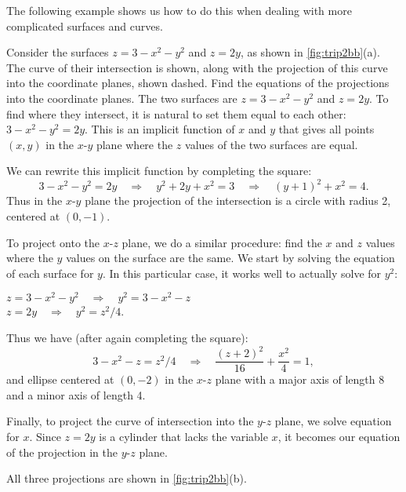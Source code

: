 The following example shows us how to do this when dealing with more complicated surfaces and curves.


\begin{example}\label{ex_trip2b}
Consider the surfaces $z=3-x^2-y^2$ and $z=2y$, as shown in \autoref{fig:trip2bb}(a). The curve of their intersection is shown, along with the projection of this curve into the coordinate planes, shown dashed. Find the equations of the projections into the coordinate planes.
\solution
The two surfaces are $z=3-x^2-y^2$ and $z=2y$. To find where they intersect, it is natural to set them equal to each other: $3-x^2-y^2=2y$. This is an implicit function of $x$ and $y$ that gives all points $(x,y)$ in the $x$-$y$ plane where the $z$ values of the two surfaces are equal. 

We can rewrite this implicit function by completing the square:
\[3-x^2-y^2=2y \quad \Rightarrow \quad y^2+2y+x^2=3\quad \Rightarrow \quad (y+1)^2+x^2=4.\]
Thus in the $x$-$y$ plane the projection of the intersection is a circle with radius 2, centered at $(0,-1)$.

To project onto the $x$-$z$ plane, we do a similar procedure: find the $x$ and $z$ values where the $y$ values on the surface are the same. We start by solving the equation of each surface for $y$. In this particular case, it works well to actually solve for $y^2$:

\noindent $z=3-x^2-y^2 \quad \Rightarrow \quad y^2=3-x^2-z$\\
\noindent $z=2y \quad \Rightarrow \quad y^2=z^2/4$.

Thus we have (after again completing the square):
\[3-x^2-z = z^2/4 \quad \Rightarrow\quad \frac{(z+2)^2}{16}+\frac{x^2}4=1,\]
and ellipse centered at $(0,-2)$ in the $x$-$z$ plane with a major axis of length 8 and a minor axis of length 4. 

Finally, to project the curve of intersection into the $y$-$z$ plane, we solve equation for $x$. Since $z=2y$ is a cylinder that lacks the variable $x$, it becomes our equation of the projection in the $y$-$z$ plane.

All three projections are shown in \autoref{fig:trip2bb}(b).
\end{example}

